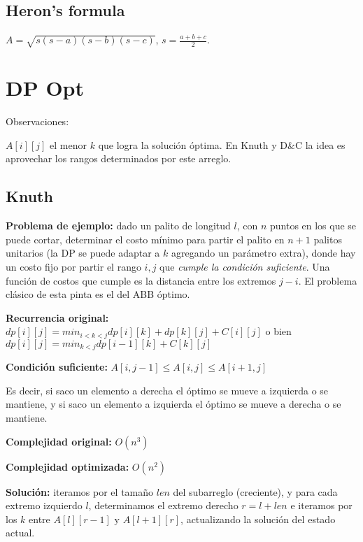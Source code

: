 \subsection{Heron's formula}
{
\( {\displaystyle A={\sqrt {s(s-a)(s-b)(s-c)}}} \),
\( {\displaystyle s={\frac {a+b+c}{2}}} \).
}

\section{DP Opt}
Observaciones:

$A[i][j]$ el menor $k$ que logra la solución óptima. En Knuth y D\&C la idea es aprovechar los rangos
determinados por este arreglo.

\subsection{Knuth}
{
    \textbf{Problema de ejemplo:} dado un palito de longitud $l$, con $n$ puntos en los que se puede cortar,
    determinar el costo mínimo para partir el palito en $n+1$ palitos unitarios (la DP se puede adaptar a $k$ 
    agregando un parámetro extra), donde hay un costo fijo por partir el rango $i, j$ que \emph{cumple la 
    condición suficiente}. Una función de costos que cumple es la distancia entre los extremos $j-i$. 
    El problema clásico de esta pinta es el del ABB óptimo.

    \textbf{Recurrencia original:} $dp[i][j] = min_{i < k < j} {dp[i][k] + dp[k][j]} + C[i][j]$ o bien 
		$dp[i][j] = min_{k < j}{dp[i - 1][k] + C[k][j]}$

    \textbf{Condición suficiente:} $A[i, j - 1] \leq  A[i, j] \leq A[i + 1, j]$

    Es decir, si saco un elemento a derecha el óptimo se mueve a izquierda o se mantiene, y 
    si saco un elemento a izquierda el óptimo se mueve a derecha o se mantiene.

    \textbf{Complejidad original:} $O(n^3)$

    \textbf{Complejidad optimizada:} $O(n^2)$

    \textbf{Solución:} iteramos por el tamaño $len$ del subarreglo (creciente), y para cada extremo izquierdo $l$,
    determinamos el extremo derecho $r=l+len$ e iteramos por los $k$ entre $A[l][r-1]$ y $A[l+1][r]$, actualizando la
    solución del estado actual.

}
